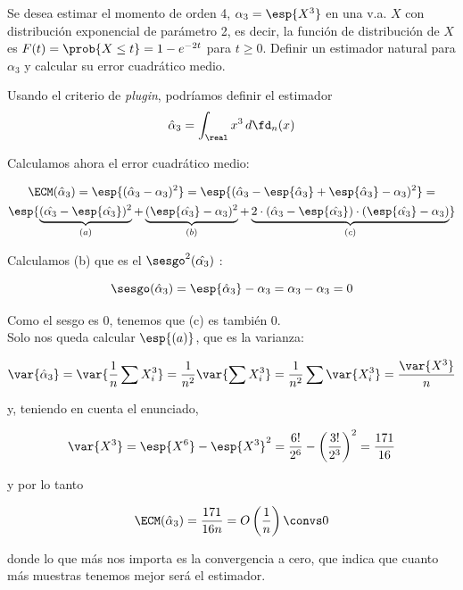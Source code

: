 \begin{problem}[1] Se desea estimar el momento de orden 4, $\alpha_3 = \esp{X^3}$ en una v.a. $X$ con distribución exponencial de parámetro 2, es decir, la función de distribución de $X$ es $F(t) = \prob{X \leq t} = 1 - e^{-2t}$ para $t\geq0$. Definir un estimador natural para $\alpha_3$ y calcular su error cuadrático medio.

\solution

Usando el criterio de \textit{plugin}, podríamos definir el estimador \[ \hat{\alpha}_3 = \int_\real x^3\,d\fd_n(x) \]

Calculamos ahora el error cuadrático medio:

\begin{gather*}
\ECM(\hat{\alpha}_3) =
\esp{(\hat{\alpha}_3 - \alpha_3)^2} =
\esp{(\hat{\alpha}_3 - \esp{\hat{\alpha}_3} + \esp{\hat{\alpha}_3} - \alpha_3 )^2} = \\
\esp{\underbrace{(\hat{\alpha_3} - \esp{\hat{\alpha_3}})^2}_{(a)} +
     \underbrace{(\esp{\hat{\alpha_3}} - \alpha_3)^2}_{(b)} +
     \underbrace{2 \cdot (\hat{\alpha}_3 - \esp{\hat{\alpha_3}}) \cdot
                    (\esp{\hat{\alpha_3}} - \alpha_3)
    }_{(c)}}
\end{gather*}

Calculamos (b) que es el $ \sesgo^2(\hat{\alpha_3}) $ :

\[ \sesgo (\hat{\alpha}_3) = \esp{\hat{\alpha}_3} - \alpha_3 = \alpha_3 - \alpha_3 = 0 \]

Como el sesgo es $0$, tenemos que (c) es también $0$. \\
Solo nos queda calcular $ \esp{(a)} $, que es la varianza:

\[
\var{\hat{\alpha}_3} =
\var{\frac{1}{n}\sum X_i^3 } =
\frac{1}{n^2}\var{\sum X_i^3} =
\frac{1}{n^2}\sum \var{X_i^3} =
\frac{\var{X^3}}{n}
\]

y, teniendo en cuenta el enunciado,

\[ \var{X^3} = \esp{X^6} - \esp{X^3}^2 = \frac{6!}{2^6} - \left(\frac{3!}{2^3}\right)^2 = \frac{171}{16} \]

y por lo tanto

\[ \ECM (\hat{\alpha}_3) = \frac{171}{16n} = O\left(\frac{1}{n}\right) \convs 0 \]

donde lo que más nos importa es la convergencia a cero, que indica que cuanto más muestras tenemos mejor será el estimador.

\end{problem}

